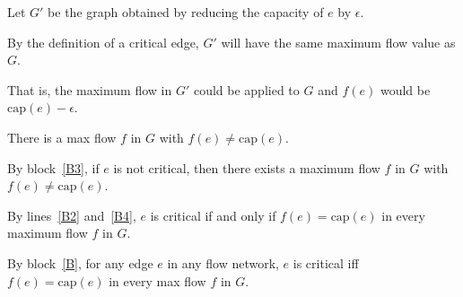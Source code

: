 \documentclass[10pt]{article}
\begin{document}
\begin{problems}
\begin{longFormProof}
\begin{block}[B]
\begin{block}[B3]
        \step Let $G'$ be the graph obtained by reducing the capacity of $e$ by $\epsilon$.

        \step By the definition of a critical edge, $G'$ will have the same maximum flow value as $G$.

        \step That is, the maximum flow in $G'$ could be applied to $G$ and $f(e)$ would be $\text{cap}(e) - \epsilon$.

        \step There is a max flow $f$ in $G$ with $f(e) \ne \text{cap}(e)$.
      \end{block}
      
      \step[B4] By block~\ref{B3}, if $e$ is not critical, then there exists a maximum flow $f$ in $G$
      with $f(e) \ne \text{cap}(e)$.

      \smallskip

      \lineacross 
    
      \step By lines~\ref{B2} and~\ref{B4},
      $e$ is critical if and only if $f(e) = \text{cap}(e)$ in every maximum flow $f$ in $G$.
    \end{block}

    \step By block~\ref{B},
    for any edge $e$ in any flow network,
    $e$ is critical iff $f(e) = \text{cap}(e)$ in every max flow $f$ in $G$.
  \end{longFormProof}

\end{problems}
\end{document}
